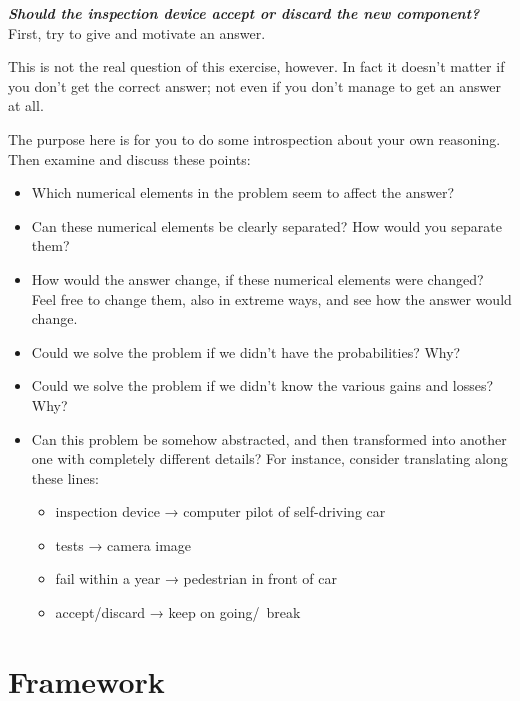 \documentclass[
  a4paper,
  DIV=11,
  numbers=noendperiod,
  oneside]{scrreprt}
\providecommand{\tightlist}{%
  \setlength{\itemsep}{0pt}\setlength{\parskip}{0pt}}\usepackage{longtable,booktabs,array}
\begin{document}
{\textbf{\emph{Should the inspection device accept or discard the new
component?}}}\\

First, try to give and motivate an answer.

This is not the real question of this exercise, however. In fact it
doesn't matter if you don't get the correct answer; not even if you
don't manage to get an answer at all.

The purpose here is for you to do some introspection about your own
reasoning. Then examine and discuss these points:

\begin{itemize}
\item
  Which numerical elements in the problem seem to affect the answer?
\item
  Can these numerical elements be clearly separated? How would you
  separate them?
\item
  How would the answer change, if these numerical elements were changed?
  Feel free to change them, also in extreme ways, and see how the answer
  would change.
\item
  Could we solve the problem if we didn't have the probabilities? Why?
\item
  Could we solve the problem if we didn't know the various gains and
  losses? Why?
\item
  Can this problem be somehow abstracted, and then transformed into
  another one with completely different details? For instance, consider
  translating along these lines:

  \begin{itemize}
  \tightlist
  \item
    inspection device → computer pilot of self-driving car
  \item
    tests → camera image
  \item
    fail within a year → pedestrian in front of car
  \item
    accept/discard → keep on going/~break
  \end{itemize}
\end{itemize}


\hypertarget{framework}{%
\chapter{Framework}\label{framework}}
\end{document}
